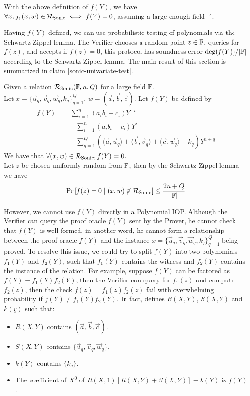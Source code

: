 With the above definition of $f(Y)$, we have $\forall x, y, (x, w) \in \mathcal{R}_{\mathrm{Sonic}} \iff f(Y) = 0$, assuming a large enough field $\mathbb{F}$.

Having $f(Y)$ defined, we can use probabilistic testing of polynomials via the Schwartz-Zippel lemma. The Verifier chooses a random point $z \in \mathbb{F}$, queries for $f(z)$, and accepts if $f(z) = 0$, this protocol has soundness error $\mathrm{deg}(f(Y)) / |\mathbb{F}|$ according to the Schwartz-Zippel lemma. The main result of this section is summarized in claim \ref{sonic-univariate-test}.

\begin{claim}
\label{sonic-univariate-test}
Given a relation $\mathcal{R}_{\mathrm{Sonic}}(\mathbb{F}, n, Q)$ for a large field $\mathbb{F}$. \\
Let $x = \{ \Vec{u}_q, \Vec{v}_q, \Vec{w}_q, k_q \}_{q=1}^{Q}$, $w = (\Vec{a}, \Vec{b}, \Vec{c})$. Let $f(Y)$ be defined by
\begin{align*}
f(Y) = & \sum_{i=1}^{n}(a_i b_i - c_i) Y^{-i} \\
& + \sum_{i=1}^{n}(a_i b_i - c_i) Y^i \\
& + \sum_{q=1}^{Q} (\langle \Vec{a}, \Vec{u}_q \rangle
      + \langle \Vec{b}, \Vec{v}_q \rangle
      + \langle \Vec{c}, \Vec{w}_q \rangle
      - k_q) Y^{n + q}
\end{align*}
We have that $\forall (x, w) \in \mathcal{R}_{\mathrm{Sonic}}, f(Y) = 0$. \\
Let $z$ be chosen uniformly random from $\mathbb{F}$, then by the Schwartz-Zippel lemma we have
$$\mathrm{Pr} \left[ f(z) = 0 \mid (x, w) \not\in \mathcal{R}_{\mathrm{Sonic}}  \right] \le \frac{2n+Q}{|\mathbb{F}|}$$
\end{claim}

However, we cannot use $f(Y)$ directly in a Polynomial IOP. Although the Verifier can query the proof oracle $f(Y)$ sent by the Prover, he cannot check that $f(Y)$ is well-formed, in another word, he cannot form a relationship between the proof oracle $f(Y)$ and the instance $x = \{ \Vec{u}_q, \Vec{v}_q, \Vec{w}_q, k_q \}_{q=1}^{Q}$ being proved. To resolve this issue, we could try to split $f(Y)$ into two polynomials $f_1(Y)$ and $f_2(Y)$, such that $f_1(Y)$ contains the witness and $f_2(Y)$ contains the instance of the relation. For example, suppose $f(Y)$ can be factored as $f(Y) = f_1(Y) f_2(Y)$, then the Verifier can query for $f_1(z)$ and compute $f_2(z)$, then the check $f(z) = f_1(z) f_2(z)$ fail with overwhelming probability if $f(Y) \ne f_1(Y) f_2(Y)$. In fact, \cite{maller2019sonic} defines $R(X, Y)$, $S(X, Y)$ and $k(y)$ such that:
\begin{itemize}
    \item $R(X, Y)$ contains $(\Vec{a}, \Vec{b}, \Vec{c})$.
    \item $S(X, Y)$ contains $\{ \Vec{u}_q, \Vec{v}_q, \Vec{w}_q \}$.
    \item $k(Y)$ contains $\{ k_q \}$.
    \item The coefficient of $X^0$ of $R(X, 1) [R(X, Y) + S(X, Y)] - k(Y)$ is $f(Y)$.
\end{itemize}

